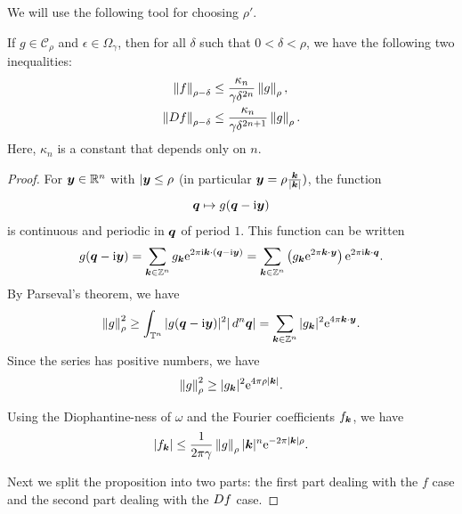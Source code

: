 \documentclass[twoside,letterpaper,10pt]{article}
\numberwithin{equation}{section}
\newcommand{\T}{\mathbb{T}}
\begin{document}
We will use the following tool for choosing $\rho'$.
\begin{prop}
  If $g \in \mathcal{C}_{\rho}$ and $\epsilon \in \Omega_{\gamma}$, then for all
  $\delta$ such that $0 < \delta < \rho$, we have the following two
  inequalities:
  \begin{align*}
    \norm{f}_{\rho - \delta} &\leq \frac{\kappa_n}{\gamma
                               \delta^{2n}}\norm{g}_{\rho},\\
    \norm{\Dif f}_{\rho - \delta} &\leq \frac{\kappa_n}{\gamma \delta^{2n + 1}}
                    \norm{g}_{\rho}.
  \end{align*}
  Here, $\kappa_n$ is a constant that depends only on $n$.
\end{prop}
\begin{proof}
  For $\bm{y} \in \mathbb{R}^n$ with $|\bm{y} \leq \rho$ (in particular $\bm{y} = \rho
  \frac{\bm{k}}{|\bm{k}|})$, the function
  \begin{equation*}
    \bm{q} \mapsto g(\bm{q} - \mathrm{i} \bm{y})
  \end{equation*}
  is continuous and periodic in $\bm{q}$ of period $1$.
  This function can be written
  \begin{equation*}
    g(\bm{q} - \mathrm{i} \bm{y}) = \sum_{\bm{k} \in \mathbb{Z}^n} g_{\bm{k}} \mathrm{e}^{2 \pi \mathrm{i}
      \bm{k} \cdot (\bm{q} - \mathrm{i} \bm{y})} = \sum_{\bm{k} \in \mathbb{Z}^n}
    \left(g_{\bm{k}} \mathrm{e}^{2 \pi \bm{k} \cdot \bm{y}} \right) \mathrm{e}^{2 \pi \mathrm{i} \bm{k}
      \cdot \bm{q}}.
  \end{equation*}
  By Parseval's theorem, we have
  \begin{equation*}
    \norm{g}_{\rho}^2 \geq \int_{\T^n} |g(\bp{q} - \i \bp{y})|^2 |\dif ^n
    \bp{q}| = \sum_{\bp{k} \in \Z^n} |g_{\bp{k}}|^2 \e^{4 \pi \bp{k} \cdot \bp{y}}.
  \end{equation*}
  Since the series has positive numbers, we have
  \begin{equation*}
    \norm{g}_{\rho}^2 \geq |g_{\bp{k}}|^2 \e^{4 \pi \rho|\bp{k}|}.
  \end{equation*}

  Using the Diophantine-ness of $\omega$ and the Fourier coefficients
  $f_{\bm{k}}$, we have
  \begin{equation*}
    |f_{\bp{k}}| \leq \frac{1}{2 \pi \gamma} \norm{g}_{\rho} |\bp{k}|^n \e^{-2
      \pi |\bp{k}| \rho}.
  \end{equation*}

  Next we split the proposition into two parts: the first part dealing with the
  $f$ case and the second part dealing with the $\mathop{}\!D f$ case.


\end{proof}
\end{document}
